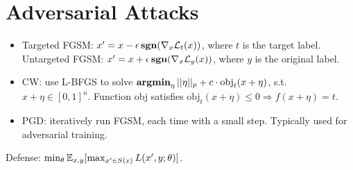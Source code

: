 \section{Adversarial Attacks}

\begin{itemize}
    \item Targeted FGSM: $x^\prime = x - \epsilon \operatorname{\textbf{sgn}}(\nabla_x \mathcal{L}_t(x))$, where $t$ is the target label. Untargeted FGSM: $x^\prime = x + \epsilon \operatorname{\textbf{sgn}}(\nabla_x \mathcal{L}_y (x))$, where $y$ is the original label.
    \item CW: use L-BFGS to solve $\operatorname{\textbf{argmin}}_\eta ||\eta||_p+c\cdot \text{obj}_t(x+\eta)$, s.t. $x+\eta\in [0,1]^n$. Function obj satisfies $\text{obj}_t(x+\eta)\le 0 \Rightarrow f(x+\eta)=t$.
    \item PGD: iteratively run FGSM, each time with a small step. Typically used for adversarial training.
\end{itemize}

Defense: $\min_\theta \mathbb{E}_{x,y} [\max_{x^\prime\in S(x)} L(x^\prime, y; \theta)]$.